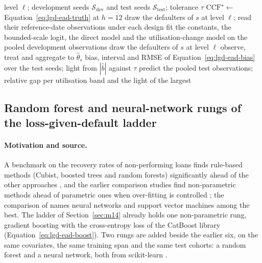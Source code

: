 \begin{algorithm}[htbp]
\caption{Estimating the conversion factor and the exposure for one acceleration level $\ell$ of case C09.}
\label{alg:lgd-ead-ccf}
\begin{algorithmic}[1]
\Require level $\ell$; development seeds $\mathcal S_{\mathrm{dev}}$ and test seeds $\mathcal S_{\mathrm{test}}$; tolerance $\tau$
\State $\mathrm{CCF}^{\star}\gets$ Equation~\eqref{eq:lgd-ead-truth} at $h=12$
  \State draw the defaulters of $s$ at level $\ell$; read their reference-date observations under each design
\EndFor
\State fit the constants, the bounded-scale logit, the direct model and the utilisation-change model on the pooled development observations
  \State draw the defaulters of $s$ at level $\ell$
    \State observe, treat and aggregate to $\hat\theta_s$
  \EndFor
\EndFor
{}
  \State bias, interval and RMSE of Equation~\eqref{eq:lgd-ead-bias} over the test seeds; light from $|\hat b|$ against $\tau$
\EndFor
{}
  \State predict the pooled test observations; relative gap per utilisation band and the light of the largest
\EndFor
\end{algorithmic}
\end{algorithm}

\subsection{Random forest and neural-network rungs of the loss-given-default ladder}
\label{sec:m34}

\paragraph{Motivation and source.} A benchmark on the recovery rates of non-performing loans finds rule-based methods (Cubist, boosted trees and random forests) significantly ahead of the other approaches \citep{lgd-ead:bellotti2021}, and the earlier comparison studies find non-parametric methods ahead of parametric ones when over-fitting is controlled \citep{lgd-ead:qizhao2011,lgd-ead:loterman2012}; the comparison of \citet{lgd-ead:loterman2012} names neural networks and support vector machines among the best. The ladder of Section~\ref{sec:m14} already holds one non-parametric rung, gradient boosting with the cross-entropy loss of the CatBoost library (Equation~\eqref{eq:lgd-ead-boost}). Two rungs are added beside the earlier six, on the same covariates, the same training span and the same test cohorts: a random forest and a neural network, both from scikit-learn \citep{lgd-ead:sklearn2011}.

